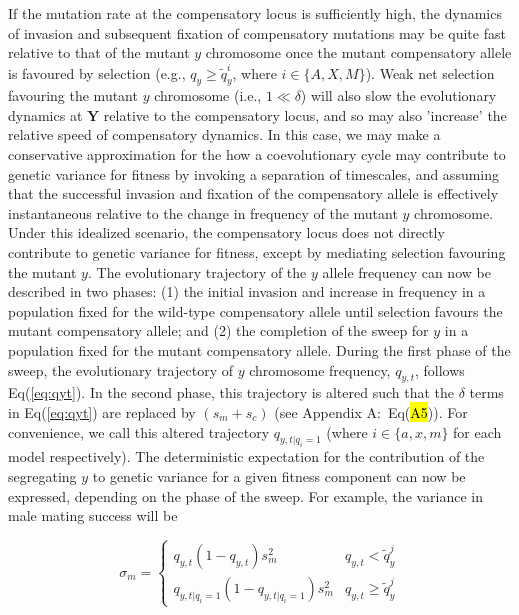 \documentclass{article}
\begin{document}
If the mutation rate at the compensatory locus is sufficiently high, the dynamics of invasion and subsequent fixation of compensatory mutations may be quite fast relative to that of the mutant $y$ chromosome once the mutant compensatory allele is favoured by selection (e.g., $q_y \geq \tilde{q}_y^{i}$, where $i \in \{A,X,M\}$). Weak net selection favouring the mutant $y$ chromosome (i.e., $1 \ll \delta$) will also slow the evolutionary dynamics at $\mathbf{Y}$ relative to the compensatory locus, and so may also 'increase' the relative speed of compensatory dynamics. In this case, we may make a conservative approximation for the how a coevolutionary cycle may contribute to genetic variance for fitness by invoking a separation of timescales, and assuming that the successful invasion and fixation of the compensatory allele is effectively instantaneous relative to the change in frequency of the mutant $y$ chromosome. Under this idealized scenario, the compensatory locus does not directly contribute to genetic variance for fitness, except by mediating selection favouring the mutant $y$. The evolutionary trajectory of the $y$ allele frequency can now be described in two phases: (1) the initial invasion and increase in frequency in a population fixed for the wild-type compensatory allele until selection favours the mutant compensatory allele; and (2) the completion of the sweep for $y$ in a population fixed for the mutant compensatory allele. During the first phase of the sweep, the evolutionary trajectory of $y$ chromosome frequency, $q_{y,t}$, follows Eq(\ref{eq:qyt}). In the second phase, this trajectory is altered such that the $\delta$ terms in Eq(\ref{eq:qyt}) are replaced by $(s_m + s_c)$ (see Appendix A:~Eq(\hl{A5})). For convenience, we call this altered trajectory $q_{y,t|q_i=1}$ (where $i \in \{a,x,m\}$ for each model respectively). The deterministic expectation for the contribution of the segregating $y$ to genetic variance for a given fitness component can now be expressed, depending on the phase of the sweep. For example, the variance in male mating success will be

\begin{equation*}
	\sigma_{m} = \left\{ \begin{array}{lcr}
				q_{y,t}(1 - q_{y,t})s_{m}^{2}      & q_{y,t} < \tilde{q}_y^j \\
				q_{y,t|q_i=1}(1 - q_{y,t|q_i=1})s_m^{2} & q_{y,t} \geq \tilde{q}_y^j
			\end{array} \right.
\end{equation*}
\end{document}
